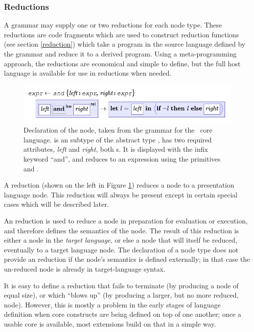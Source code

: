 \subsubsection{Reductions}
A grammar may supply one or two reductions for each node type. These reductions are code fragments which are used to construct reduction functions (see section \ref{reduction}) which take a program in the source language defined by the grammar and reduce it to a derived program. Using a meta-programming approach, the reductions are economical and simple to define, but the full host language is available for use in reductions when needed. %

\begin{figure}[ht]

  \includegraphics{src/image/and.pdf}
  \caption{Declaration of the  node, taken from the grammar for the \Meta\ core language.  is an subtype of the abstract type , has two required attributes, \emph{left} and \emph{right}, both s. It is displayed with the infix keyword ``and'', and reduces to an expression using the primitives  and .}
  \label{fig-and}
\end{figure}

A  reduction (shown on the left in Figure \ref{fig-and}) reduces a node to a presentation language node. This reduction will always be present except in certain special cases which will be described later.

An  reduction is used to reduce a node in preparation for evaluation or execution, and therefore defines the semantics of the node. The result of this reduction is either a node in the \emph{target language}, or else a node that will itself be reduced, eventually to a target language node. The declaration of a node type does not provide an  reduction if the node's semantics is defined externally; in that case the un-reduced node is already in target-language syntax.

It is easy to define a reduction that fails to terminate (by producing a node of equal size), or which ``blows up'' (by producing a larger, but no more reduced, node). However, this is mostly a problem in the early stages of language definition when core constructs are being defined on top of one another; once a usable core is available, most extensions build on that in a simple way.

